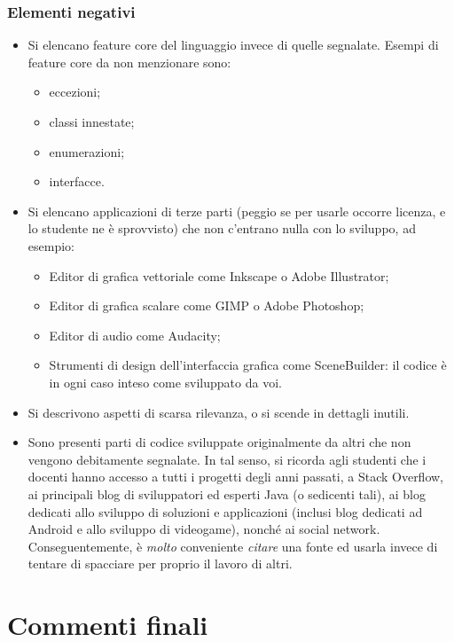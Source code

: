 \documentclass[a4paper,12pt]{report}
\begin{document}
\subsection*{Elementi negativi}
\begin{itemize}
	\item Si elencano feature core del linguaggio invece di quelle segnalate. Esempi di feature 
core da non menzionare sono:
    \begin{itemize}
        \item eccezioni;
        \item classi innestate;
        \item enumerazioni;
        \item interfacce.
    \end{itemize}
	\item Si elencano applicazioni di terze parti (peggio se per usarle occorre licenza, e lo 
studente ne è sprovvisto) che non c'entrano nulla con lo sviluppo, ad esempio:
    \begin{itemize}
        \item Editor di grafica vettoriale come Inkscape o Adobe Illustrator;
        \item Editor di grafica scalare come GIMP o Adobe Photoshop;
        \item Editor di audio come Audacity;
        \item Strumenti di design dell'interfaccia grafica come SceneBuilder: il codice è in ogni caso inteso come sviluppato da voi.
    \end{itemize}
	\item Si descrivono aspetti di scarsa rilevanza, o si scende in dettagli inutili.
	\item Sono presenti parti di codice sviluppate originalmente da altri che non vengono
debitamente segnalate. In tal senso, si ricorda agli studenti che i docenti hanno accesso a tutti i 
progetti degli anni passati, a Stack Overflow, ai principali blog di sviluppatori ed esperti Java (o sedicenti tali), ai blog dedicati allo sviluppo di soluzioni e applicazioni (inclusi blog dedicati ad Android e allo sviluppo di videogame), nonché ai social network. Conseguentemente, è \emph{molto} conveniente \emph{citare} una fonte ed usarla invece di tentare di spacciare per proprio il lavoro di altri.
\end{itemize}

\chapter{Commenti finali}
\end{document}
